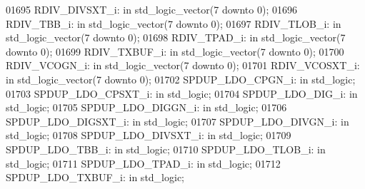 \begin{DoxyCode}
01695     RDIV\_DIVSXT\_i:  \textcolor{keywordflow}{in} \textcolor{comment}{std\_logic\_vector}(\textcolor{vhdllogic}{}\textcolor{vhdllogic}{7} \textcolor{keywordflow}{downto} \textcolor{vhdllogic}{}\textcolor{vhdllogic}{0});
01696     RDIV\_TBB\_i: \textcolor{keywordflow}{in} \textcolor{comment}{std\_logic\_vector}(\textcolor{vhdllogic}{}\textcolor{vhdllogic}{7} \textcolor{keywordflow}{downto} \textcolor{vhdllogic}{}\textcolor{vhdllogic}{0});
01697     RDIV\_TLOB\_i:    \textcolor{keywordflow}{in} \textcolor{comment}{std\_logic\_vector}(\textcolor{vhdllogic}{}\textcolor{vhdllogic}{7} \textcolor{keywordflow}{downto} \textcolor{vhdllogic}{}\textcolor{vhdllogic}{0});
01698     RDIV\_TPAD\_i:    \textcolor{keywordflow}{in} \textcolor{comment}{std\_logic\_vector}(\textcolor{vhdllogic}{}\textcolor{vhdllogic}{7} \textcolor{keywordflow}{downto} \textcolor{vhdllogic}{}\textcolor{vhdllogic}{0});
01699     RDIV\_TXBUF\_i:   \textcolor{keywordflow}{in} \textcolor{comment}{std\_logic\_vector}(\textcolor{vhdllogic}{}\textcolor{vhdllogic}{7} \textcolor{keywordflow}{downto} \textcolor{vhdllogic}{}\textcolor{vhdllogic}{0});
01700     RDIV\_VCOGN\_i:   \textcolor{keywordflow}{in} \textcolor{comment}{std\_logic\_vector}(\textcolor{vhdllogic}{}\textcolor{vhdllogic}{7} \textcolor{keywordflow}{downto} \textcolor{vhdllogic}{}\textcolor{vhdllogic}{0});
01701     RDIV\_VCOSXT\_i:  \textcolor{keywordflow}{in} \textcolor{comment}{std\_logic\_vector}(\textcolor{vhdllogic}{}\textcolor{vhdllogic}{7} \textcolor{keywordflow}{downto} \textcolor{vhdllogic}{}\textcolor{vhdllogic}{0});
01702     SPDUP\_LDO\_CPGN\_i:   \textcolor{keywordflow}{in} \textcolor{comment}{std\_logic};
01703     SPDUP\_LDO\_CPSXT\_i:  \textcolor{keywordflow}{in} \textcolor{comment}{std\_logic};
01704     SPDUP\_LDO\_DIG\_i:    \textcolor{keywordflow}{in} \textcolor{comment}{std\_logic};
01705     SPDUP\_LDO\_DIGGN\_i:  \textcolor{keywordflow}{in} \textcolor{comment}{std\_logic};
01706     SPDUP\_LDO\_DIGSXT\_i: \textcolor{keywordflow}{in} \textcolor{comment}{std\_logic};
01707     SPDUP\_LDO\_DIVGN\_i:  \textcolor{keywordflow}{in} \textcolor{comment}{std\_logic};
01708     SPDUP\_LDO\_DIVSXT\_i: \textcolor{keywordflow}{in} \textcolor{comment}{std\_logic};
01709     SPDUP\_LDO\_TBB\_i:    \textcolor{keywordflow}{in} \textcolor{comment}{std\_logic};
01710     SPDUP\_LDO\_TLOB\_i:   \textcolor{keywordflow}{in} \textcolor{comment}{std\_logic};
01711     SPDUP\_LDO\_TPAD\_i:   \textcolor{keywordflow}{in} \textcolor{comment}{std\_logic};
01712     SPDUP\_LDO\_TXBUF\_i:  \textcolor{keywordflow}{in} \textcolor{comment}{std\_logic};

\end{DoxyCode}

